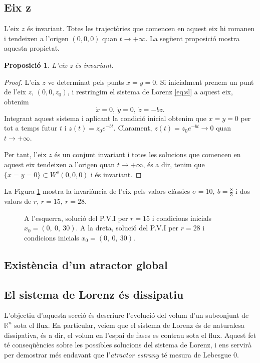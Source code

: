 \documentclass[11pt,a4paper,openright,oneside]{article}
\numberwithin{equation}{section}
\newtheorem{prop}[teo]{Proposici\'o}
\theoremstyle{definition}
\begin{document}
\subsection{Eix z}
L'eix $z$ és invariant. Totes les trajectòries que comencen en aquest eix hi romanen i tendeixen a l'origen $(0,0,0)$ quan $t\to+\infty$. La següent proposició mostra aquesta propietat. 

\begin{prop} 
    L'eix z és invariant.
\end{prop}

\begin{proof}
    L'eix $z$ ve determinat pels punts $x=y=0$. Si inicialment prenem un punt de l'eix $z$, $(0,0,z_0)$, i restringim el sistema de Lorenz \eqref{eq:sl} a aquest eix, obtenim 
    \begin{equation*} 
        \dot{x}=0, \ \dot{y}=0, \ \dot{z}=-bz.
    \end{equation*} Integrant aquest sistema i aplicant la condició inicial obtenim que $x=y=0$ per tot a temps futur $t$ i $z(t)=z_0e^{-bt}$. Clarament, $z(t)=z_0e^{-bt}\rightarrow{0}$ quan $t\rightarrow{+\infty}$. 
    
    Per tant, l'eix $z$ és un conjunt invariant i totes les solucions que comencen en aquest eix tendeixen a l'origen quan $t\rightarrow{+\infty}$, és a dir, tenim que $\{x=y=0\} \subset W^{s}(0,0,0)$ i és invariant.
\end{proof}

La Figura \ref{fig:invariant} mostra la invariància de l'eix pels valors clàssics $\sigma=10, \ b=\frac{8}{3}$ i dos valors de $r$, $r=15, \ r=28$.

\begin{figure}[htbp]
    \centering
    \qquad
    \caption{A l'esquerra, solució del P.V.I per $r=15$ i condicions inicials $x_0=(0,\ 0, \ 30)$. A la dreta, solució del P.V.I per $r=28$ i condicions inicials $x_0=(0, \ 0,\ 30 )$.}
    \label{fig:invariant}
\end{figure} 


\subsection{Existència d'un atractor global} \label{sssec:atractor_global}

\subsection*{El sistema de Lorenz és dissipatiu}
L'objectiu d'aquesta secció és descriure l'evolució del volum d'un subconjunt de $\mathbb{R}^{n}$ sota el flux. En particular, veiem que el sistema de Lorenz és de naturalesa dissipativa, és a dir, el volum en l'espai de fases es contrau sota el flux. Aquest fet té conseqüències sobre les possibles solucions del sistema de Lorenz, i ens servirà per demostrar més endavant que l'\textit{atractor estrany} té mesura de Lebesgue $0$. 
\end{document}
